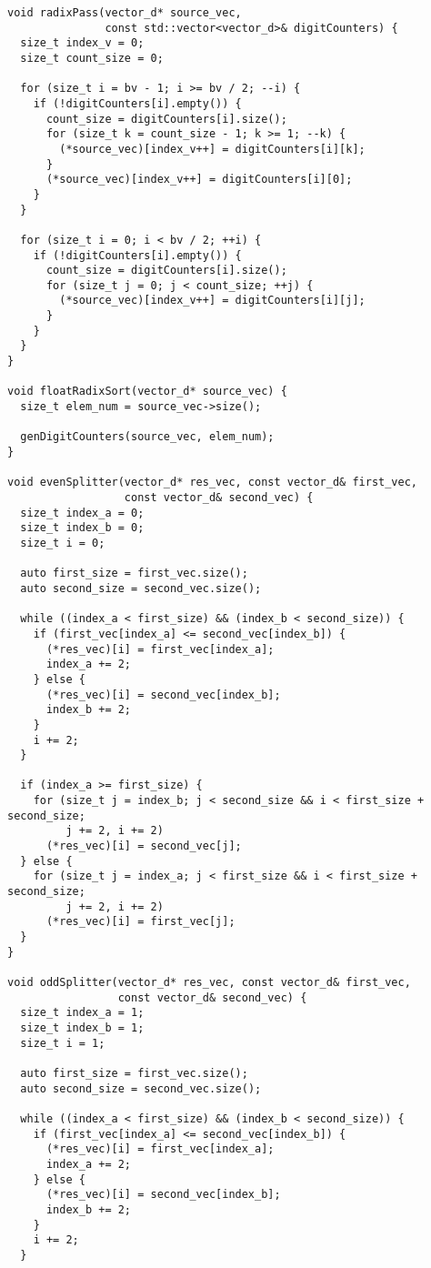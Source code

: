 \documentclass{report}
\begin{document}
\begin{lstlisting}
void radixPass(vector_d* source_vec,
               const std::vector<vector_d>& digitCounters) {
  size_t index_v = 0;
  size_t count_size = 0;

  for (size_t i = bv - 1; i >= bv / 2; --i) {
    if (!digitCounters[i].empty()) {
      count_size = digitCounters[i].size();
      for (size_t k = count_size - 1; k >= 1; --k) {
        (*source_vec)[index_v++] = digitCounters[i][k];
      }
      (*source_vec)[index_v++] = digitCounters[i][0];
    }
  }

  for (size_t i = 0; i < bv / 2; ++i) {
    if (!digitCounters[i].empty()) {
      count_size = digitCounters[i].size();
      for (size_t j = 0; j < count_size; ++j) {
        (*source_vec)[index_v++] = digitCounters[i][j];
      }
    }
  }
}

void floatRadixSort(vector_d* source_vec) {
  size_t elem_num = source_vec->size();

  genDigitCounters(source_vec, elem_num);
}

void evenSplitter(vector_d* res_vec, const vector_d& first_vec,
                  const vector_d& second_vec) {
  size_t index_a = 0;
  size_t index_b = 0;
  size_t i = 0;

  auto first_size = first_vec.size();
  auto second_size = second_vec.size();

  while ((index_a < first_size) && (index_b < second_size)) {
    if (first_vec[index_a] <= second_vec[index_b]) {
      (*res_vec)[i] = first_vec[index_a];
      index_a += 2;
    } else {
      (*res_vec)[i] = second_vec[index_b];
      index_b += 2;
    }
    i += 2;
  }

  if (index_a >= first_size) {
    for (size_t j = index_b; j < second_size && i < first_size + second_size;
         j += 2, i += 2)
      (*res_vec)[i] = second_vec[j];
  } else {
    for (size_t j = index_a; j < first_size && i < first_size + second_size;
         j += 2, i += 2)
      (*res_vec)[i] = first_vec[j];
  }
}

void oddSplitter(vector_d* res_vec, const vector_d& first_vec,
                 const vector_d& second_vec) {
  size_t index_a = 1;
  size_t index_b = 1;
  size_t i = 1;

  auto first_size = first_vec.size();
  auto second_size = second_vec.size();

  while ((index_a < first_size) && (index_b < second_size)) {
    if (first_vec[index_a] <= second_vec[index_b]) {
      (*res_vec)[i] = first_vec[index_a];
      index_a += 2;
    } else {
      (*res_vec)[i] = second_vec[index_b];
      index_b += 2;
    }
    i += 2;
  }


\end{lstlisting}
\end{document}
